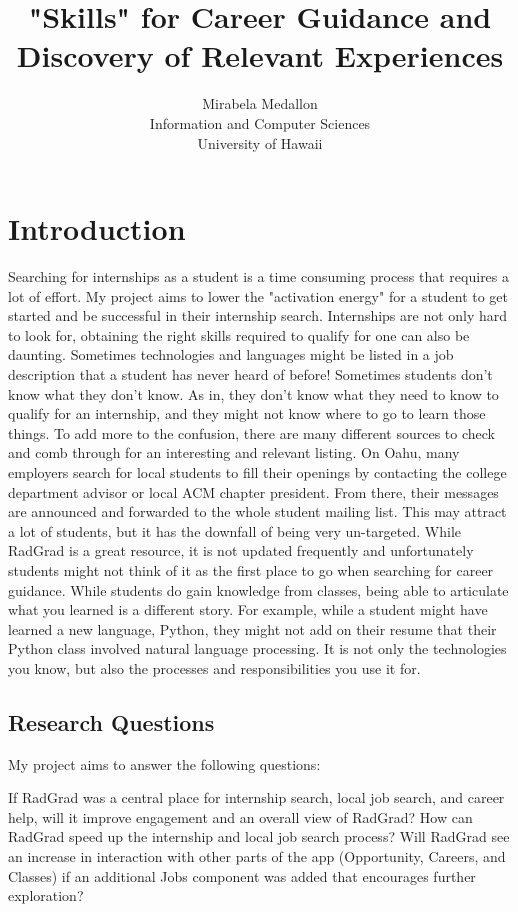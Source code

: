 \documentclass[english]{proposalnsf}
\title{"Skills" for Career Guidance and Discovery of Relevant Experiences}
\author{Mirabela Medallon \\ Information and Computer Sciences \\ University of Hawaii}
\begin{document}
	\maketitle
	\tableofcontents
	\newpage
	
	\section{Introduction}
	\label{introduction}
    Searching for internships as a student is a time consuming process that requires a lot of effort. My project aims to lower the "activation energy" for a student to get started and be successful in their internship search. Internships are not only hard to look for, obtaining the right skills required to qualify for one can also be daunting. Sometimes technologies and languages might be listed in a job description that a student has never heard of before! Sometimes students don't know what they don't know. As in, they don't know what they need to know to qualify for an internship, and they might not know where to go to learn those things.  To add more to the confusion, there are many different sources to check and comb through for an interesting and relevant listing. On Oahu, many employers search for local students to fill their openings by contacting the college department advisor or local ACM chapter president. From there, their messages are announced and forwarded to the whole student mailing list. This may attract a lot of students, but it has the downfall of being very un-targeted.  While RadGrad is a great resource, it is not updated frequently and unfortunately students might not think of it as the first place to go when searching for career guidance. 
    While students do gain knowledge from classes, being able to articulate what you learned is a different story. For example, while a student might have learned a new language, Python, they might not add on their resume that their Python class involved natural language processing. It is not only the technologies you know, but also the processes and responsibilities you use it for. 

	\subsection{Research Questions}
	\label{questions}

My project aims to answer the following questions: 
\begin{outline}
    \1 If RadGrad was a central place for internship search, local job search, and career help, will it improve engagement and an overall view of RadGrad?
    \1 How can RadGrad speed up the internship and local job search process?
    \1 Will RadGrad see an increase in interaction with other parts of the app (Opportunity, Careers, and Classes) if an additional Jobs component was added that encourages further exploration?
\end{outline}
\end{document}
